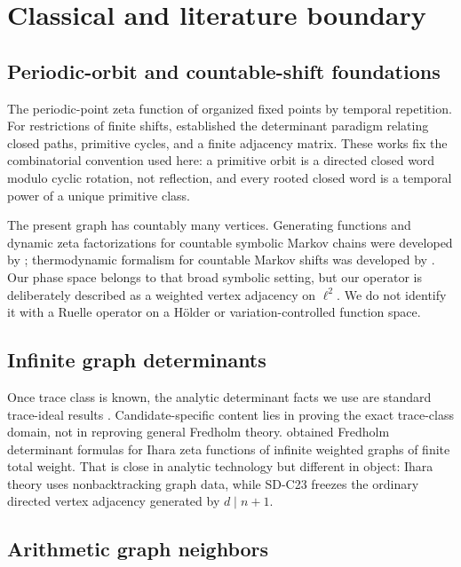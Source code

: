 \section{Classical and literature boundary}
\label{sec:literature}

\subsection{Periodic-orbit and countable-shift foundations}

The periodic-point zeta function of \citet{ArtinMazur1965} organized fixed
points by temporal repetition.  For restrictions of finite shifts,
\citet{BowenLanford1970} established the determinant paradigm relating
closed paths, primitive cycles, and a finite adjacency matrix.  These works
fix the combinatorial convention used here: a primitive orbit is a directed
closed word modulo cyclic rotation, not reflection, and every rooted closed
word is a temporal power of a unique primitive class.

The present graph has countably many vertices.  Generating functions and
dynamic zeta factorizations for countable symbolic Markov chains were
developed by \citet{GurevichSavchenko1998}; thermodynamic formalism for
countable Markov shifts was developed by \citet{Sarig1999}.  Our phase space
belongs to that broad symbolic setting, but our operator is deliberately
described as a weighted vertex adjacency on \(\ell^2\).  We do not identify
it with a Ruelle operator on a Hölder or variation-controlled function space.

\subsection{Infinite graph determinants}

Once trace class is known, the analytic determinant facts we use are standard
trace-ideal results \citep{Simon1977}.  Candidate-specific content lies in
proving the exact trace-class domain, not in reproving general Fredholm
theory.  \citet{Deitmar2015} obtained Fredholm determinant formulas for
Ihara zeta functions of infinite weighted graphs of finite total weight.
That is close in analytic technology but different in object: Ihara theory
uses nonbacktracking graph data, while SD-C23 freezes the ordinary directed
vertex adjacency generated by \(d\mid n+1\).

\subsection{Arithmetic graph neighbors}

